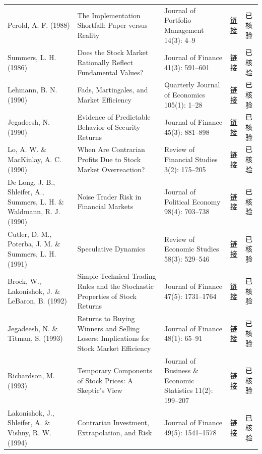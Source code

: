 \begin{longtable}{@{}>{\raggedright\arraybackslash}p{2.55cm}>{\raggedright\arraybackslash}p{4.7cm}>{\raggedright\arraybackslash}p{2.7cm}>{\raggedright\arraybackslash}p{1.9cm}>{\raggedright\arraybackslash}p{1.45cm}@{}}
Perold, A. F. (1988) & The Implementation Shortfall: Paper versus Reality & Journal of Portfolio Management 14(3): 4--9 & \href{https://doi.org/10.3905/jpm.1988.409150}{链接} & 已核验 \\
Summers, L. H. (1986) & Does the Stock Market Rationally Reflect Fundamental Values? & Journal of Finance 41(3): 591--601 & \href{https://doi.org/10.1111/j.1540-6261.1986.tb04519.x}{链接} & 已核验 \\
Lehmann, B. N. (1990) & Fads, Martingales, and Market Efficiency & Quarterly Journal of Economics 105(1): 1--28 & \href{https://doi.org/10.2307/2937816}{链接} & 已核验 \\
Jegadeesh, N. (1990) & Evidence of Predictable Behavior of Security Returns & Journal of Finance 45(3): 881--898 & \href{https://doi.org/10.1111/j.1540-6261.1990.tb05110.x}{链接} & 已核验 \\
Lo, A. W. \& MacKinlay, A. C. (1990) & When Are Contrarian Profits Due to Stock Market Overreaction? & Review of Financial Studies 3(2): 175--205 & \href{https://doi.org/10.1093/rfs/3.2.175}{链接} & 已核验 \\
De Long, J. B., Shleifer, A., Summers, L. H. \& Waldmann, R. J. (1990) & Noise Trader Risk in Financial Markets & Journal of Political Economy 98(4): 703--738 & \href{https://doi.org/10.1086/261703}{链接} & 已核验 \\
Cutler, D. M., Poterba, J. M. \& Summers, L. H. (1991) & Speculative Dynamics & Review of Economic Studies 58(3): 529--546 & \href{https://doi.org/10.2307/2298010}{链接} & 已核验 \\
Brock, W., Lakonishok, J. \& LeBaron, B. (1992) & Simple Technical Trading Rules and the Stochastic Properties of Stock Returns & Journal of Finance 47(5): 1731--1764 & \href{https://doi.org/10.1111/j.1540-6261.1992.tb04681.x}{链接} & 已核验 \\
Jegadeesh, N. \& Titman, S. (1993) & Returns to Buying Winners and Selling Losers: Implications for Stock Market Efficiency & Journal of Finance 48(1): 65--91 & \href{https://doi.org/10.1111/j.1540-6261.1993.tb04702.x}{链接} & 已核验 \\
Richardson, M. (1993) & Temporary Components of Stock Prices: A Skeptic's View & Journal of Business \& Economic Statistics 11(2): 199--207 & \href{https://doi.org/10.1080/07350015.1993.10509948}{链接} & 已核验 \\
Lakonishok, J., Shleifer, A. \& Vishny, R. W. (1994) & Contrarian Investment, Extrapolation, and Risk & Journal of Finance 49(5): 1541--1578 & \href{https://doi.org/10.1111/j.1540-6261.1994.tb04772.x}{链接} & 已核验 \\

\end{longtable}
